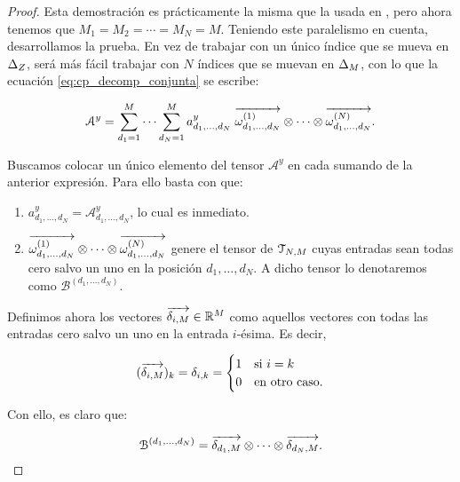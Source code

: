 \begin{proof}

	Esta demostración es prácticamente la misma que la usada en , pero ahora tenemos que $M_1 = M_2 = \cdots = M_N = M$. Teniendo este paralelismo en cuenta, desarrollamos la prueba. En vez de trabajar con un único índice que se mueva en $\Delta_{Z}$, será más fácil trabajar con $N$ índices que se muevan en $\Delta_{M}$, con lo que la ecuación \eqref{eq:cp_decomp_conjunta} se escribe:

    \begin{equation}
        \mathcal{A}^y = \sum_{d_1 = 1}^{M} \cdots \sum_{d_N = 1}^{M} a^y_{d_1, \ldots, d_N} \; \overrightarrow{\omega^{(1)}_{d_1, \ldots, d_N}} \otimes \cdots \otimes \overrightarrow{\omega^{(N)}_{d_1, \ldots, d_N}}.
    \end{equation}

    Buscamos colocar un único elemento del tensor $\mathcal{A}^y$ en cada sumando de la anterior expresión. Para ello basta con que:

    \begin{enumerate}
        \item $a^y_{d_1, \ldots, d_N} = \mathcal{A}^y_{d_1, \ldots, d_N}$, lo cual es inmediato.
        \item $\overrightarrow{\omega^{(1)}_{d_1, \ldots, d_N}} \otimes \cdots \otimes \overrightarrow{\omega^{(N)}_{d_1, \ldots, d_N}}$ genere el tensor de $\mathcal{T}_{N, M}$ cuyas entradas sean todas cero salvo un uno en la posición $d_1, \ldots, d_N$. A dicho tensor lo denotaremos como $\mathcal{B}^{(d_1, \ldots, d_N)}$.
    \end{enumerate}

    Definimos ahora los vectores $\overrightarrow{\delta_{i, M}} \in \mathbb{R}^M$ como aquellos vectores con todas las entradas cero salvo un uno en la entrada $i$-ésima. Es decir,

    \begin{equation}
        (\overrightarrow{\delta_{i, M}})_k = \delta_{i, k} =
        \begin{cases}
            1 & \text{si } i = k    \\
            0 & \text{en otro caso.}
        \end{cases}
    \end{equation}

    Con ello, es claro que:

    \begin{equation}
        \mathcal{B}^{(d_1, \ldots, d_N)} = \overrightarrow{\delta_{d_1, M}} \otimes \cdots \otimes \overrightarrow{\delta_{d_N, M}}.
    \end{equation}


\end{proof}
